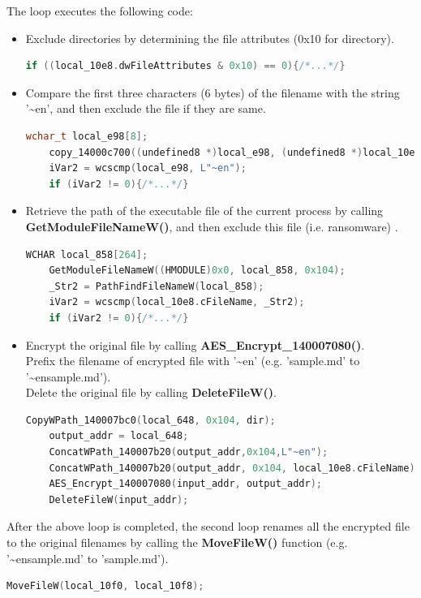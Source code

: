 \documentclass[11pt]{article}
\begin{document}
The loop executes the following code:
\begin{itemize}
  \item Exclude directories by determining the file attributes (0x10 for directory).
  \begin{lstlisting}[language=c++]
    if ((local_10e8.dwFileAttributes & 0x10) == 0){/*...*/}
\end{lstlisting}

  \item Compare the first three characters (6 bytes) of the filename with the string '\textasciitilde en', and then exclude the file if they are same.
  \begin{lstlisting}[language=c++]
    wchar_t local_e98[8];
    copy_14000c700((undefined8 *)local_e98, (undefined8 *)local_10e8.cFileName, 6);
    iVar2 = wcscmp(local_e98, L"~en");
    if (iVar2 != 0){/*...*/}
\end{lstlisting}

  \item Retrieve the path of the executable file of the current process by calling \textbf{GetModuleFileNameW()}, and then exclude this file (i.e. ransomware) .
  \begin{lstlisting}[language=c++]
    WCHAR local_858[264];
    GetModuleFileNameW((HMODULE)0x0, local_858, 0x104);
    _Str2 = PathFindFileNameW(local_858);
    iVar2 = wcscmp(local_10e8.cFileName, _Str2);
    if (iVar2 != 0){/*...*/}
\end{lstlisting}

  \item Encrypt the original file by calling \textbf{AES\_Encrypt\_140007080()}. \\Prefix the filename of encrypted file with '\textasciitilde en' (e.g. 'sample.md' to '\textasciitilde ensample.md'). \\Delete the original file by calling \textbf{DeleteFileW()}.
  \begin{lstlisting}[language=c++]
    CopyWPath_140007bc0(local_648, 0x104, dir);
    output_addr = local_648;
    ConcatWPath_140007b20(output_addr,0x104,L"~en");
    ConcatWPath_140007b20(output_addr, 0x104, local_10e8.cFileName);
    AES_Encrypt_140007080(input_addr, output_addr);
    DeleteFileW(input_addr);
\end{lstlisting}
\end{itemize}

After the above loop is completed, the second loop renames all the encrypted file to the original filenames by calling the \textbf{MoveFileW()} function (e.g. '\textasciitilde ensample.md' to 'sample.md').
  \begin{lstlisting}[language=c++]
    MoveFileW(local_10f0, local_10f8);
\end{lstlisting}
\end{document}
